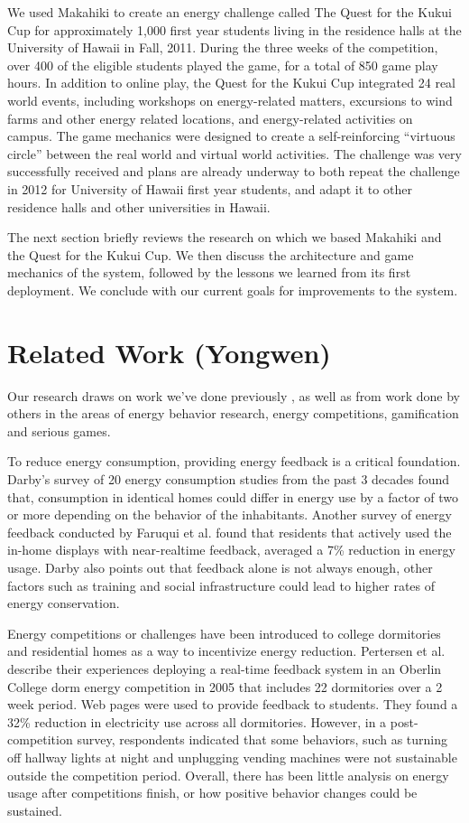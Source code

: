 \documentclass{acm_proc_article-sp}
\begin{document}
We used Makahiki to create an energy challenge called The Quest for the
Kukui Cup for approximately 1,000 first year students living in the
residence halls at the University of Hawaii in Fall, 2011.  During the
three weeks of the competition, over 400 of the eligible students played
the game, for a total of 850 game play hours.  In addition to online play,
the Quest for the Kukui Cup integrated 24 real world events, including
workshops on energy-related matters, excursions to wind farms and other
energy related locations, and energy-related activities on campus. The game
mechanics were designed to create a self-reinforcing ``virtuous circle''
between the real world and virtual world activities.  The challenge was
very successfully received and plans are already underway to both repeat
the challenge in 2012 for University of Hawaii first year students, and 
adapt it to other residence halls and other universities in Hawaii.

The next section briefly reviews the research on which we based Makahiki
and the Quest for the Kukui Cup.   We then discuss the architecture and
game mechanics of the system, followed by the lessons we learned from its
first deployment. We conclude with our current goals for improvements to
the system.

\section{Related Work (Yongwen)}
Our research draws on work we've done previously
\cite{csdl2-10-05,csdl2-10-07,csdl2-11-02,csdl2-11-03}, as well as from
work done by others in the areas of energy behavior research, energy competitions, gamification and serious games. 

To reduce energy consumption, providing energy feedback is a  critical foundation. Darby's survey of 20 energy consumption studies from the past 3 decades found  that, consumption in identical homes could differ in energy use by a factor of two or more depending on the behavior of the inhabitants\cite{5}. Another survey of energy feedback conducted by Faruqui et al. found that residents that actively used the in-home displays with near-realtime feedback, averaged a 7\% reduction in energy usage\cite{6}. Darby also points out that feedback alone is not always enough, other factors such as training and social infrastructure could lead to higher rates of energy conservation\cite{7}.

Energy competitions or challenges have been introduced to college dormitories and residential homes as a way to incentivize energy reduction. Pertersen et al. describe their experiences deploying a real-time feedback system in an Oberlin College dorm energy competition in 2005 \cite{3} that includes 22 dormitories over a 2 week period. Web pages were used to provide feedback to students. They found a 32\% reduction in electricity use across all dormitories. However, in a post-competition survey, respondents indicated that some behaviors, such as turning off hallway lights at night and unplugging vending machines were not sustainable outside the competition period.  Overall, there has been little analysis on energy usage after competitions finish, or how positive behavior changes could be sustained.
\end{document}
